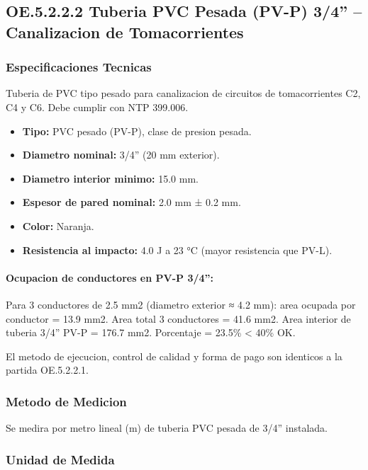 \subsection{OE.5.2.2.2 Tuberia PVC Pesada (PV-P) 3/4'' -- Canalizacion de Tomacorrientes}

\subsubsection{Especificaciones Tecnicas}

Tuberia de PVC tipo pesado para canalizacion de circuitos de tomacorrientes C2, C4 y C6. Debe cumplir con NTP 399.006.

\begin{itemize}[nosep]
  \item \textbf{Tipo:} PVC pesado (PV-P), clase de presion pesada.
  \item \textbf{Diametro nominal:} 3/4'' (20 mm exterior).
  \item \textbf{Diametro interior minimo:} 15.0 mm.
  \item \textbf{Espesor de pared nominal:} 2.0 mm ± 0.2 mm.
  \item \textbf{Color:} Naranja.
  \item \textbf{Resistencia al impacto:} 4.0 J a 23 °C (mayor resistencia que PV-L).
\end{itemize}

\paragraph{Ocupacion de conductores en PV-P 3/4'':}
Para 3 conductores de 2.5 mm2 (diametro exterior ≈ 4.2 mm): area ocupada por conductor = 13.9 mm2. Area total 3 conductores = 41.6 mm2. Area interior de tuberia 3/4'' PV-P = 176.7 mm2. Porcentaje = 23.5\% < 40\% OK.

El metodo de ejecucion, control de calidad y forma de pago son identicos a la partida OE.5.2.2.1.

\subsubsection{Metodo de Medicion}

Se medira por metro lineal (m) de tuberia PVC pesada de 3/4'' instalada.

\subsubsection{Unidad de Medida}


